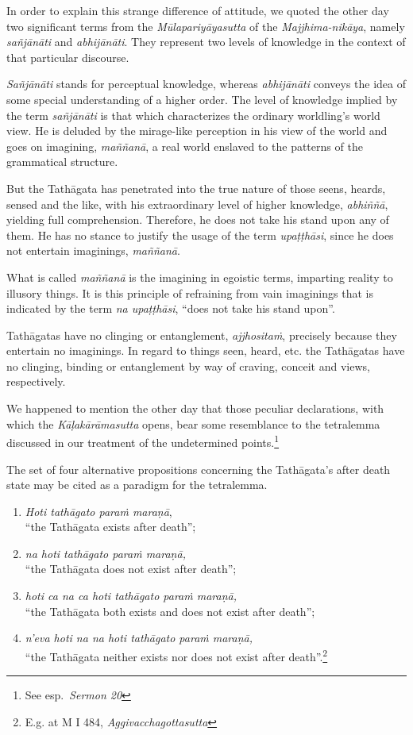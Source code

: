 In order to explain this strange difference of attitude, we quoted the other day two significant terms from the \emph{Mūlapariyāyasutta} of the \emph{Majjhima-nikāya}, namely \emph{sañjānāti} and \emph{abhijānāti}. They represent two levels of knowledge in the context of that particular discourse.

\emph{Sañjānāti} stands for perceptual knowledge, whereas \emph{abhijānāti} conveys the idea of some special understanding of a higher order. The level of knowledge implied by the term \emph{sañjānāti} is that which characterizes the ordinary worldling's world view. He is deluded by the mirage-like perception in his view of the world and goes on imagining, \emph{maññanā}, a real world enslaved to the patterns of the grammatical structure.

But the Tathāgata has penetrated into the true nature of those seens, heards, sensed and the like, with his extraordinary level of higher knowledge, \emph{abhiññā}, yielding full comprehension. Therefore, he does not take his stand upon any of them. He has no stance to justify the usage of the term \emph{upaṭṭhāsi}, since he does not entertain imaginings, \emph{maññanā}.

What is called \emph{maññanā} is the imagining in egoistic terms, imparting reality to illusory things. It is this principle of refraining from vain imaginings that is indicated by the term \emph{na upaṭṭhāsi}, ``does not take his stand upon''.

Tathāgatas have no clinging or entanglement, \emph{ajjhositaṁ}, precisely because they entertain no imaginings. In regard to things seen, heard, etc. the Tathāgatas have no clinging, binding or entanglement by way of craving, conceit and views, respectively.

We happened to mention the other day that those peculiar declarations, with which the \emph{Kāḷakārāmasutta} opens, bear some resemblance to the tetralemma discussed in our treatment of the undetermined points.\footnote{See esp.~\emph{Sermon 20}}

The set of four alternative propositions concerning the Tathāgata's after death state may be cited as a paradigm for the tetralemma.

\begin{enumerate}
\def\labelenumi{\arabic{enumi}.}
\tightlist
\item
  \emph{Hoti tathāgato paraṁ maraṇā},\\
  ``the Tathāgata exists after death'';
\item
  \emph{na hoti tathāgato paraṁ maraṇā,}\\
  ``the Tathāgata does not exist after death'';
\item
  \emph{hoti ca na ca hoti tathāgato paraṁ maraṇā,}\\
  ``the Tathāgata both exists and does not exist after death'';
\item
  \emph{n'eva hoti na na hoti tathāgato paraṁ maraṇā,}\\
  ``the Tathāgata neither exists nor does not exist after death''.\footnote{E.g. at M I 484, \emph{Aggivacchagottasutta}}
\end{enumerate}

